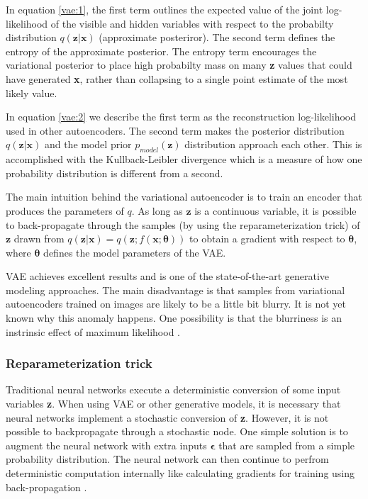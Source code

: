 In equation \ref{vae:1}, the first term outlines the expected value of the joint
log-likelihood of the visible and hidden variables with respect to the
probabilty distribution $q(\textbf{z}|\textbf{x})$ (approximate posteriror). The
second term defines the entropy of the approximate posterior. The entropy term
encourages the variational posterior to place high probabilty mass on many
\textbf{z} values that could have generated \textbf{x}, rather than collapsing
to a single point estimate of the most likely value.

In equation \ref{vae:2} we describe the first term as the reconstruction
log-likelihood used in other autoencoders. The second term makes the posterior
distribution $q(\textbf{z}|\textbf{x})$ and the model prior
$p_{model}(\textbf{z})$ distribution approach each other. This is accomplished with the
Kullback-Leibler divergence which is a measure of how one probability
distribution is different from a second.

The main intuition behind the variational autoencoder is to train an encoder that
produces the parameters of $q$. As long as $\textbf{z}$ is a continuous
variable, it is possible to back-propagate through the samples (by using the
reparameterization trick) of $\textbf{z}$ drawn from $q(\textbf{z}|\textbf{x}) =
q(\textbf{z};f(\textbf{x};\boldsymbol\theta))$ to obtain a gradient with respect
to $\boldsymbol\theta$, where $\boldsymbol\theta$ defines the model parameters
of the VAE.

VAE achieves excellent results and is one of the state-of-the-art generative
modeling approaches. The main disadvantage is that samples from variational
autoencoders trained on images are likely to be a little bit blurry. It is not
yet known why this anomaly happens. One possibility is that the blurriness is an
instrinsic effect of maximum likelihood \cite{Goodfellow-et-al-2016}.

\subsubsection{Reparameterization trick}
Traditional neural networks execute a deterministic conversion of some input
variables \textbf{z}. When using VAE or other generative models, it is necessary
that neural networks implement a stochastic conversion of \textbf{z}.
However, it is not possible to backpropagate through a stochastic node. One
simple solution is to augment the neural network with extra inputs
$\boldsymbol\epsilon$ that are sampled from a simple probability distribution.
The neural network can then continue to perfrom deterministic computation
internally like calculating gradients for training using back-propagation
\cite{kingma2015variational}.

